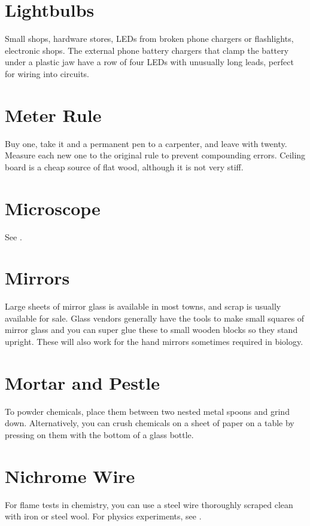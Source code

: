 \section{Lightbulbs}
\label{sec:lightbulbs}
Small shops, 
hardware stores, 
LEDs from broken phone chargers or flashlights, 
electronic shops. 
The external phone battery chargers that clamp the battery 
under a plastic jaw have a row of four LEDs with unusually long leads, 
perfect for wiring into circuits.

\section{Meter Rule}
\label{sec:meter-rule}
Buy one, 
take it and a permanent pen to a carpenter, 
and leave with twenty. 
Measure each new one to the original rule to prevent compounding errors. 
Ceiling board is a cheap source of flat wood, 
although it is not very stiff.

\section{Microscope}
\label{sec:microscope}
See .

\section{Mirrors}
\label{sec:mirrors}
Large sheets of mirror glass is available in most towns, 
and scrap is usually available for sale. 
Glass vendors generally have the tools 
to make small squares of mirror glass 
and you can super glue these to small wooden blocks so they stand upright. 
These will also work for the hand mirrors sometimes required in biology.

\section{Mortar and Pestle}
\label{sec:mortar-and-pestle}
To powder chemicals, 
place them between two nested metal spoons and grind down. 
Alternatively, 
you can crush chemicals on a sheet of paper on a table 
by pressing on them with the bottom of a glass bottle.

\section{Nichrome Wire}
\label{sec:nichrome-wire}
For flame tests in chemistry, 
you can use a steel wire thoroughly scraped clean with iron or steel wool. 
For physics experiments, 
see .

